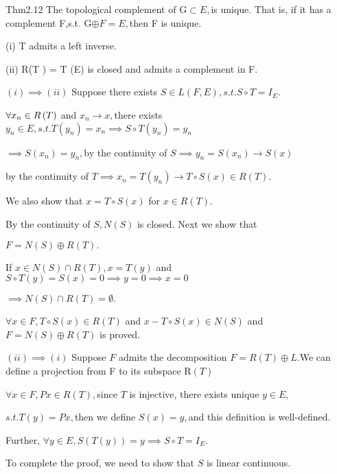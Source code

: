 \documentclass{article}
\begin{document}
\bigskip Thm2.12 The topological complement of G$\subset E,$is unique. That
is, if it has a complement F,s.t. G$\oplus F=E,$then F is unique.

(i) T admits a left inverse.

(ii) R(T ) = T (E) is closed and admits a complement in F.

$\left( i\right) \implies \left( ii\right) $ Suppose there exists $S\in
L\left( F,E\right) ,s.t.S\circ T=I_{E}.$

$\bigskip \forall x_{n}\in R\left( T\right) $ and $x_{n}\rightarrow x,$there
exists $y_{n}\in E,s.t.T\left( y_{n}\right) =x_{n}\implies S\circ T\left(
y_{n}\right) =y_{n}$

$\implies S\left( x_{n}\right) =y_{n},$by the continuity of $S\implies
y_{n}=S\left( x_{n}\right) \rightarrow S\left( x\right) $

by the continuity of $T\implies x_{n}=T\left( y_{n}\right) \rightarrow
T\circ S\left( x\right) \in R\left( T\right) .$

We also show that $x=T\circ S\left( x\right) $ for $x\in R\left( T\right) .$

By the continuity of $S,N\left( S\right) $ is closed. Next we show that

$F=N\left( S\right) \oplus R\left( T\right) .$

If $x\in N\left( S\right) \cap R\left( T\right) ,x=T\left( y\right) $ and $%
S\circ T\left( y\right) =S\left( x\right) =0\implies y=0\implies x=0$

$\implies N\left( S\right) \cap R\left( T\right) =\emptyset .$

$\forall x\in F,T\circ S\left( x\right) \in R\left( T\right) $ and $x-T\circ
S\left( x\right) \in N\left( S\right) $ and $F=N\left( S\right) \oplus
R\left( T\right) $ is proved.

$\left( ii\right) \implies \left( i\right) $ Suppose $F$ admits the
decomposition $F=R\left( T\right) \oplus L.$We can define a projection from
F to its subspace R$\left( T\right) $

$\forall x\in F,Px\in R\left( T\right) ,$since $T$ is injective, there
exists unique $y\in E,$

$s.t.T\left( y\right) =Px,$then we define $S\left( x\right) =y,$and this
definition is well-defined.

Further, $\forall y\in E,S\left( T\left( y\right) \right) =y\implies S\circ
T=I_{E}.$

To complete the proof, we need to show that $S$ is linear continuous. 
\end{document}
